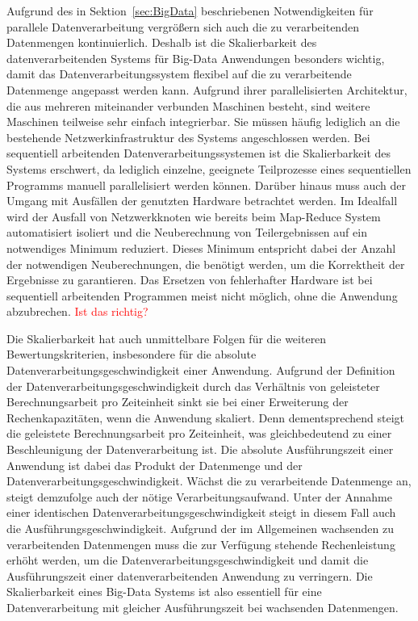 Aufgrund des in Sektion~\ref{sec:BigData} beschriebenen Notwendigkeiten für parallele Datenverarbeitung vergrößern sich auch die zu verarbeitenden Datenmengen kontinuierlich. Deshalb ist die Skalierbarkeit des datenverarbeitenden Systems für Big-Data Anwendungen besonders wichtig, damit das Datenverarbeitungssystem flexibel auf die zu verarbeitende Datenmenge angepasst werden kann. Aufgrund ihrer parallelisierten Architektur, die aus mehreren miteinander verbunden Maschinen besteht, sind weitere Maschinen teilweise sehr einfach integrierbar. Sie müssen häufig lediglich an die bestehende Netzwerkinfrastruktur des Systems angeschlossen werden. Bei sequentiell arbeitenden Datenverarbeitungssystemen ist die Skalierbarkeit des Systems erschwert, da lediglich einzelne, geeignete Teilprozesse eines sequentiellen Programms manuell parallelisiert werden können. Darüber hinaus muss auch der Umgang mit Ausfällen der genutzten Hardware betrachtet werden. Im Idealfall wird der Ausfall von Netzwerkknoten wie bereits beim Map-Reduce System automatisiert isoliert und die Neuberechnung von Teilergebnissen auf ein notwendiges Minimum reduziert. Dieses Minimum entspricht dabei der Anzahl der notwendigen Neuberechnungen, die benötigt werden, um die Korrektheit der Ergebnisse zu garantieren. Das Ersetzen von fehlerhafter Hardware ist bei sequentiell arbeitenden Programmen meist nicht möglich, ohne die Anwendung abzubrechen. \textcolor{red}{Ist das richtig?}

Die Skalierbarkeit hat auch unmittelbare Folgen für die weiteren Bewertungskriterien, insbesondere für die absolute Datenverarbeitungsgeschwindigkeit einer Anwendung. Aufgrund der Definition der Datenverarbeitungsgeschwindigkeit durch das Verhältnis von geleisteter Berechnungsarbeit pro Zeiteinheit sinkt sie bei einer Erweiterung der Rechenkapazitäten, wenn die Anwendung skaliert. Denn dementsprechend steigt die geleistete Berechnungsarbeit pro Zeiteinheit, was gleichbedeutend zu einer Beschleunigung der Datenverarbeitung ist. Die absolute Ausführungszeit einer Anwendung ist dabei das Produkt der Datenmenge und der Datenverarbeitungsgeschwindigkeit. Wächst die zu verarbeitende Datenmenge an, steigt demzufolge auch der nötige Verarbeitungsaufwand. Unter der Annahme einer identischen Datenverarbeitungsgeschwindigkeit steigt in diesem Fall auch die Ausführungsgeschwindigkeit. Aufgrund der im Allgemeinen wachsenden zu verarbeitenden Datenmengen muss die zur Verfügung stehende Rechenleistung erhöht werden, um die Datenverarbeitungsgeschwindigkeit und damit die Ausführungszeit einer datenverarbeitenden Anwendung zu verringern. Die Skalierbarkeit eines Big-Data Systems ist also essentiell für eine Datenverarbeitung mit gleicher Ausführungszeit bei wachsenden Datenmengen.

